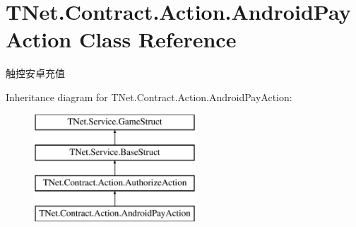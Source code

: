 \hypertarget{class_t_net_1_1_contract_1_1_action_1_1_android_pay_action}{}\section{T\+Net.\+Contract.\+Action.\+Android\+Pay\+Action Class Reference}
\label{class_t_net_1_1_contract_1_1_action_1_1_android_pay_action}


触控安卓充值  


Inheritance diagram for T\+Net.\+Contract.\+Action.\+Android\+Pay\+Action\+:\begin{figure}[H]
\begin{center}
\leavevmode
\includegraphics[height=4.000000cm]{class_t_net_1_1_contract_1_1_action_1_1_android_pay_action}
\end{center}
\end{figure}
